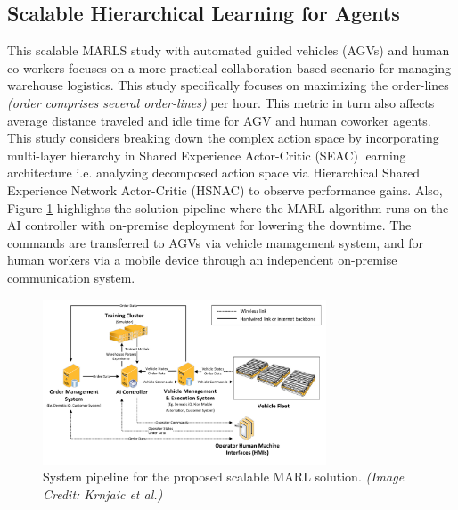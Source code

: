 \documentclass{article}
\begin{document}
\subsection{Scalable Hierarchical Learning for Agents}


This scalable MARLS study with automated guided vehicles (AGVs) and human co-workers focuses on a more practical collaboration based scenario for managing warehouse logistics.
This study specifically focuses on maximizing the order-lines \textit{(order comprises several order-lines)} per hour.
This metric in turn also affects average distance traveled and idle time for AGV and human coworker agents.
This study considers breaking down the complex action space by incorporating multi-layer hierarchy in Shared Experience Actor-Critic (SEAC) learning architecture i.e. analyzing decomposed action space via Hierarchical Shared Experience Network Actor-Critic (HSNAC) to observe performance gains.
Also, Figure \ref{fig:scale-learn-pipeline} highlights the solution pipeline where the MARL algorithm runs on the AI controller with on-premise deployment for lowering the downtime.
The commands are transferred to AGVs via vehicle management system, and for human workers via a mobile device through an independent on-premise communication system.


\begin{figure}[h]
    \centering
    \includegraphics[width=0.75\textwidth]{scalable-rl-learning-example.png}
    \caption{System pipeline for the proposed scalable MARL solution. \textit{(Image Credit: Krnjaic et al.)}}
    \label{fig:scale-learn-pipeline}
\end{figure}


\end{document}
